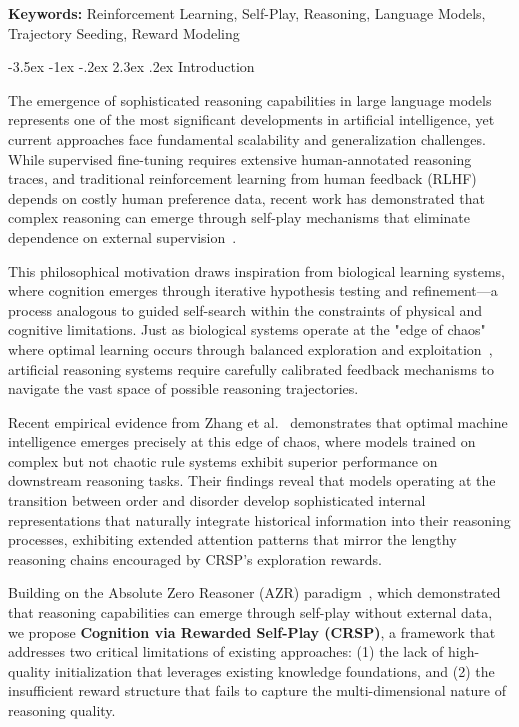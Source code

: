 \documentclass[10pt,a4paper]{article}
\makeatletter
\renewcommand\section{\@startsection{section}{1}{\z@}%
  {-3.5ex \@plus -1ex \@minus -.2ex}%
  {2.3ex \@plus.2ex}%
  {\fontfamily{sourcecodepro}\selectfont\Large\bfseries}}
\makeatother
\begin{document}
\textbf{Keywords:} Reinforcement Learning, Self-Play, Reasoning, Language Models, Trajectory Seeding, Reward Modeling

\section{Introduction}

The emergence of sophisticated reasoning capabilities in large language models represents one of the most significant developments in artificial intelligence, yet current approaches face fundamental scalability and generalization challenges. While supervised fine-tuning requires extensive human-annotated reasoning traces, and traditional reinforcement learning from human feedback (RLHF) depends on costly human preference data, recent work has demonstrated that complex reasoning can emerge through self-play mechanisms that eliminate dependence on external supervision~\cite{zhao2025absolute, ye2025emergence}.

This philosophical motivation draws inspiration from biological learning systems, where cognition emerges through iterative hypothesis testing and refinement—a process analogous to guided self-search within the constraints of physical and cognitive limitations. Just as biological systems operate at the "edge of chaos" where optimal learning occurs through balanced exploration and exploitation~\cite{langton1990computation}, artificial reasoning systems require carefully calibrated feedback mechanisms to navigate the vast space of possible reasoning trajectories.

Recent empirical evidence from Zhang et al.~\cite{zhang2024intelligence} demonstrates that optimal machine intelligence emerges precisely at this edge of chaos, where models trained on complex but not chaotic rule systems exhibit superior performance on downstream reasoning tasks. Their findings reveal that models operating at the transition between order and disorder develop sophisticated internal representations that naturally integrate historical information into their reasoning processes, exhibiting extended attention patterns that mirror the lengthy reasoning chains encouraged by CRSP's exploration rewards.

Building on the Absolute Zero Reasoner (AZR) paradigm~\cite{zhao2025absolute}, which demonstrated that reasoning capabilities can emerge through self-play without external data, we propose \textbf{Cognition via Rewarded Self-Play (CRSP)}, a framework that addresses two critical limitations of existing approaches: (1) the lack of high-quality initialization that leverages existing knowledge foundations, and (2) the insufficient reward structure that fails to capture the multi-dimensional nature of reasoning quality.
\end{document}
